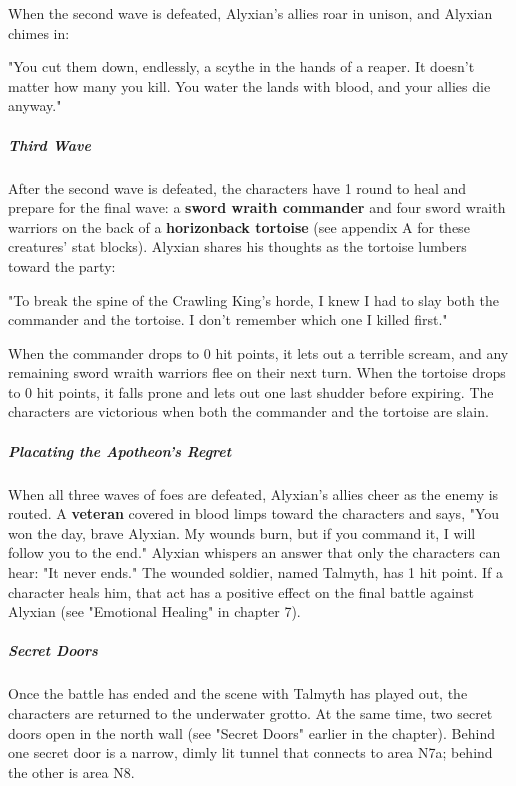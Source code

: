 \documentclass[10pt,a4paper,twoside,bg=print,twocolumn,openany,nodeprecatedcode]{dndbook}
\begin{document}
When the second wave is defeated, Alyxian's allies roar in unison, and Alyxian chimes in:

\begin{DndReadAloud}{}
"You cut them down, endlessly, a scythe in the hands of a reaper. It doesn't matter how many you kill. You water the lands with blood, and your allies die anyway."

\end{DndReadAloud}

\subparagraph{Third Wave}
After the second wave is defeated, the characters have 1 round to heal and prepare for the final wave: a \textbf{sword wraith commander} and four sword wraith warriors on the back of a \textbf{horizonback tortoise} (see appendix A for these creatures' stat blocks). Alyxian shares his thoughts as the tortoise lumbers toward the party:

\begin{DndReadAloud}{}
"To break the spine of the Crawling King's horde, I knew I had to slay both the commander and the tortoise. I don't remember which one I killed first."

\end{DndReadAloud}

When the commander drops to 0 hit points, it lets out a terrible scream, and any remaining sword wraith warriors flee on their next turn. When the tortoise drops to 0 hit points, it falls prone and lets out one last shudder before expiring. The characters are victorious when both the commander and the tortoise are slain.

\subparagraph{Placating the Apotheon's Regret}
When all three waves of foes are defeated, Alyxian's allies cheer as the enemy is routed. A \textbf{veteran} covered in blood limps toward the characters and says, "You won the day, brave Alyxian. My wounds burn, but if you command it, I will follow you to the end." Alyxian whispers an answer that only the characters can hear: "It never ends." The wounded soldier, named Talmyth, has 1 hit point. If a character heals him, that act has a positive effect on the final battle against Alyxian (see "Emotional Healing" in chapter 7).

\subparagraph{Secret Doors}
Once the battle has ended and the scene with Talmyth has played out, the characters are returned to the underwater grotto. At the same time, two secret doors open in the north wall (see "Secret Doors" earlier in the chapter). Behind one secret door is a narrow, dimly lit tunnel that connects to area N7a; behind the other is area N8.
\end{document}
